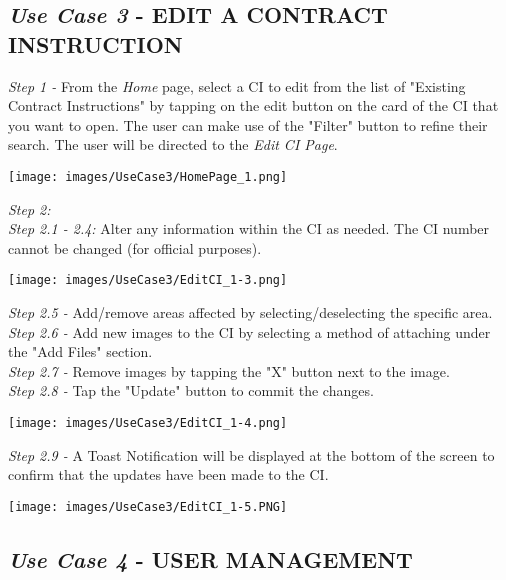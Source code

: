 \documentclass[11pt]{article}
\begin{document}
    \subsection{\textit{Use Case 3} - \uppercase{Edit a Contract Instruction}}
            \textit{Step 1 -} From the \textit{Home} page, select a CI to edit from the list of "Existing Contract Instructions" by tapping on the edit button on the card of the CI that you want to open. The user can make use of the "Filter" button to refine their search. The user will be directed to the \textit{Edit CI Page}.\\[0.5cm]
            \begin{center}
                \texttt{[image: images/UseCase3/HomePage\_1.png]}
            \end{center}
            \textit{Step 2:}\\[0.5cm]
            \textit{Step 2.1 - 2.4:} Alter any information within the CI as needed. The CI number cannot be changed (for official purposes).\\[0.5cm]
            \begin{center}
                \texttt{[image: images/UseCase3/EditCI\_1-3.png]}
            \end{center}
            \textit{Step 2.5 -} Add/remove areas affected by selecting/deselecting the specific area.\\[0.5cm]
            \textit{Step 2.6 -} Add new images to the CI by selecting a method of attaching under the "Add Files" section.\\[0.5cm]
            \textit{Step 2.7 -} Remove images by tapping the "X" button next to the image.\\[0.5cm]
            \textit{Step 2.8 -} Tap the "Update" button to commit the changes. \\[0.5cm]
            \begin{center}
                \texttt{[image: images/UseCase3/EditCI\_1-4.png]}
            \end{center}
            \textit{Step 2.9 -} A Toast Notification will be displayed at the bottom of the screen to confirm that the updates have been made to the CI.\\[0.5cm]
            \begin{center}
                \texttt{[image: images/UseCase3/EditCI\_1-5.PNG]}
            \end{center}
    \subsection{\textit{Use Case 4} - \uppercase{User Management}}
\end{document}
